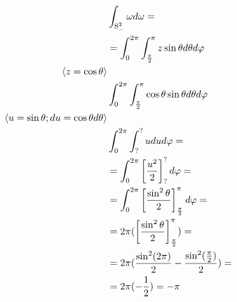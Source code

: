\begin{align*}
&\int_{\mathrm{S}_{-}^{2}} \omega d\omega=\\
&=\int_{0}^{2\pi}\int_{\frac{\pi}{2}}^{\pi}z\sin\theta \space d\theta d\varphi\\
\left\langle z=\cos\theta \right\rangle\\
&\int_{0}^{2\pi}\int_{\frac{\pi}{2}}^{\pi}\cos\theta\sin\theta \space d\theta d\varphi\\
\left\langle u =\sin\theta\space;du=\cos\theta\space d\theta \right\rangle\\
&\int_{0}^{2\pi}\int_{?}^{?}u \space dud\varphi =\\
&=\int_{0}^{2\pi}\left[\frac{u^{2}}{2}\right]_{?}^{?} d\varphi=\\
&=\int_{0}^{2\pi}\left[\frac{\sin^{2}\theta}{2} \right]_{\frac{\pi}{2}}^{\pi}d\varphi=\\
&=2\pi(\left[\frac{\sin^{2}\theta}{2} \right]_{\frac{\pi}{2}}^{\pi})=\\
&=2\pi(\frac{\sin^{2}(2\pi)}{2}-\frac{\sin^{2}(\frac{\pi}{2})}{2})=\\
&=2\pi(-\frac{1}{2})=-\pi
\end{align*}